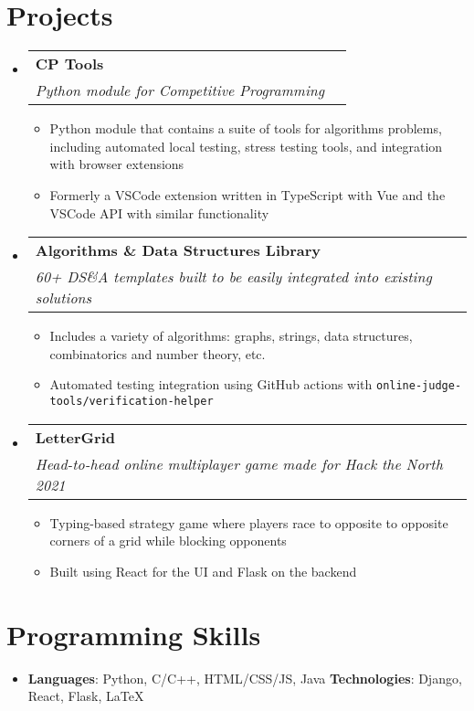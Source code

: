 \documentclass[letterpaper,11pt]{article}
\makeatletter
\newcommand{\resumeText}[1]{
  \item\small{
    \textbf{}{#1 \vspace{-2pt}}
  }
}
\newcommand{\resumeSubheading}[4]{
  \vspace{-1pt}\item
    \begin{tabular*}{0.97\textwidth}[t]{l@{\extracolsep{\fill}}r}
      \textbf{#1} & #2 \\
      \textit{\small#3} & \textit{\small #4} \\
    \end{tabular*}\vspace{-5pt}
}
\newcommand{\resumeSubHeadingListStart}{\begin{itemize}[leftmargin=*]}
\newcommand{\resumeSubHeadingListEnd}{\end{itemize}}
\newcommand{\resumeItemListStart}{\begin{itemize}}
\newcommand{\resumeItemListEnd}{\end{itemize}\vspace{-5pt}}
\newcommand{\code}[1]{\colorbox{light-gray}{\texttt{#1}}}
\makeatother
\begin{document}
\section{Projects}
  \resumeSubHeadingListStart
    \resumeSubheading{CP Tools}{}
      {Python module for Competitive Programming}{}
      \resumeItemListStart
        \resumeText{Python module that contains a suite of tools for algorithms problems, including automated local testing, stress testing tools, and integration with browser extensions}
        \resumeText{Formerly a VSCode extension written in TypeScript with Vue and the VSCode API with similar functionality}
      \resumeItemListEnd
    \resumeSubheading{Algorithms \& Data Structures Library}{}
      {60+ DS\&A templates built to be easily integrated into existing solutions}{}
      \resumeItemListStart
        \resumeText{Includes a variety of algorithms: graphs, strings, data structures, combinatorics and number theory, etc.}{}
        \resumeText{Automated testing integration using GitHub actions with \code{online-judge-tools/verification-helper}}
      \resumeItemListEnd
    \resumeSubheading{LetterGrid}{}
      {Head-to-head online multiplayer game made for Hack the North 2021}{}
      \resumeItemListStart
        \resumeText{Typing-based strategy game where players race to opposite to opposite corners of a grid while blocking opponents}
        \resumeText{Built using React for the UI and Flask on the backend}
      \resumeItemListEnd
  \resumeSubHeadingListEnd

\section{Programming Skills}
 \resumeSubHeadingListStart
   \item{
     \textbf{Languages}{: Python, C/C++, HTML/CSS/JS, Java}
     \hfill
     \textbf{Technologies}{: Django, React, Flask, \LaTeX}
   }
 \resumeSubHeadingListEnd

\end{document}

